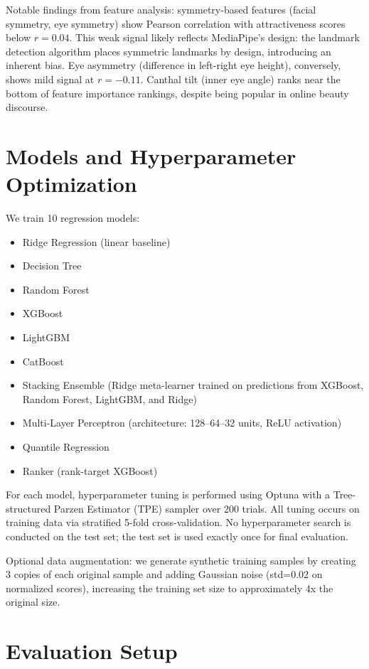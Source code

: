 \documentclass[a4paper,oneside,bibliography=totoc]{scrbook}
\begin{document}
Notable findings from feature analysis: symmetry-based features (facial symmetry, eye symmetry) show Pearson correlation with attractiveness scores below $r=0.04$. This weak signal likely reflects MediaPipe's design: the landmark detection algorithm places symmetric landmarks by design, introducing an inherent bias. Eye asymmetry (difference in left-right eye height), conversely, shows mild signal at $r=-0.11$. Canthal tilt (inner eye angle) ranks near the bottom of feature importance rankings, despite being popular in online beauty discourse.

\section{Models and Hyperparameter Optimization}

We train 10 regression models:

\begin{itemize}
\item Ridge Regression (linear baseline)
\item Decision Tree
\item Random Forest
\item XGBoost
\item LightGBM
\item CatBoost
\item Stacking Ensemble (Ridge meta-learner trained on predictions from XGBoost, Random Forest, LightGBM, and Ridge)
\item Multi-Layer Perceptron (architecture: 128--64--32 units, ReLU activation)
\item Quantile Regression
\item Ranker (rank-target XGBoost)
\end{itemize}

For each model, hyperparameter tuning is performed using Optuna with a Tree-structured Parzen Estimator (TPE) sampler over 200 trials. All tuning occurs on training data via stratified 5-fold cross-validation. No hyperparameter search is conducted on the test set; the test set is used exactly once for final evaluation.

Optional data augmentation: we generate synthetic training samples by creating 3 copies of each original sample and adding Gaussian noise (std=0.02 on normalized scores), increasing the training set size to approximately 4x the original size.

\section{Evaluation Setup}
\end{document}
